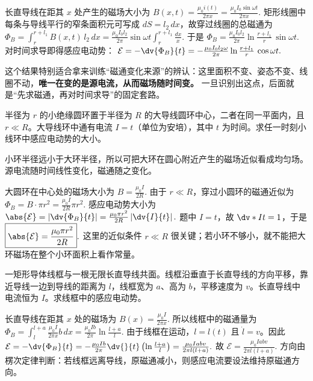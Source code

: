 \documentclass[lang=cn,11pt]{elegantbook}
\begin{document}
\begin{solution}
长直导线在距其 \(x\) 处产生的磁场大小为
 \(B(x,t)=\frac{\mu_0 i(t)}{2\pi x} =\frac{\mu_0 I_0\sin\omega t}{2\pi x}.\) 
矩形线圈中每条与导线平行的窄条面积元可写成 \(dS=l_2\,dx\)，故穿过线圈的总磁通为
 \(\Phi_B =\int_r^{r+l_1} B(x,t)\,l_2\,dx =\frac{\mu_0 I_0l_2}{2\pi}\sin\omega t \int_r^{r+l_1}\frac{dx}{x}.\) 
于是
 \(\Phi_B =\frac{\mu_0 I_0l_2}{2\pi}\ln\frac{r+l_1}{r}\,\sin\omega t.\) 
对时间求导即得感应电动势：
 \(\mathcal{E} =-\dv{\Phi_B}{t} =-\frac{\mu_0 I_0l_2\omega}{2\pi}\ln\frac{r+l_1}{r}\,\cos\omega t.\) 

这个结果特别适合拿来训练“磁通变化来源”的辨认：这里面积不变、姿态不变、线圈不动，\textbf{唯一在变的是源电流，从而磁场随时间变。} 一旦识别出这点，后面就是“先求磁通，再对时间求导”的固定套路。
\end{solution}

\begin{exercise}
半径为 \(r\) 的小绝缘圆环置于半径为 \(R\) 的大导线圆环中心，二者在同一平面内，且 \(r\ll R\)。大导线环中通有电流 \(I=t\)（单位为安培），其中 \(t\) 为时间。求任一时刻小线环中感应电动势的大小。
\end{exercise}

\begin{solution}
小环半径远小于大环半径，所以可把大环在圆心附近产生的磁场近似看成均匀场。源电流随时间线性变化，磁通随之变化。

大圆环在中心处的磁场大小为
 \(B=\frac{\mu_0 I}{2R}.\) 
由于 \(r\ll R\)，穿过小圆环的磁通近似为
 \(\Phi_B=B\cdot \pi r^2 =\frac{\mu_0 I}{2R}\pi r^2.\) 
感应电动势大小为
 \(\abs{\mathcal{E}} =\left|\dv{\Phi_B}{t}\right| =\frac{\mu_0\pi r^2}{2R}\left|\dv{I}{t}\right|.\) 
题中 \(I=t\)，故 \(\dv*{I}{t}=1\)，于是
 \(\boxed{ \abs{\mathcal{E}}=\frac{\mu_0\pi r^2}{2R} }.\) 
这里的近似条件 \(r\ll R\) 很关键；若小环不够小，就不能把大环磁场在整个小环面积上看作常量。
\end{solution}

\begin{exercise}[运动矩形线框在长直电流磁场中的感应电动势]
一矩形导体线框与一根无限长直导线共面。线框沿垂直于长直导线的方向平移，靠近导线一边到导线的距离为 \(l\)，线框宽为 \(a\)、高为 \(b\)，平移速度为 \(v\)。长直导线中电流恒为 \(I\)。求线框中的感应电动势。
\end{exercise}

\begin{solution}
长直导线在距其 \(x\) 处的磁场为
 \(B(x)=\frac{\mu_0I}{2\pi x}.\) 
所以线框中的磁通量为
 \(\Phi_B=\int_l^{l+a}\frac{\mu_0I}{2\pi x}b\,dx =\frac{\mu_0Ib}{2\pi}\ln\frac{l+a}{l}.\) 
由于线框在运动，\(l=l(t)\) 且 \(\dot l=v\)。因此
 \(\mathcal{E}=-\dv{\Phi_B}{t} =-\frac{\mu_0Ib}{2\pi}\dv{}{t}\left(\ln\frac{l+a}{l}\right) =\frac{\mu_0Iabv}{2\pi l(l+a)}.\) 
故
 \(\boxed{ \mathcal{E}=\frac{\mu_0Iabv}{2\pi l(l+a)} }.\) 
方向由楞次定律判断：若线框远离导线，原磁通减小，则感应电流要设法维持原磁通方向。
\end{solution}
\end{document}
